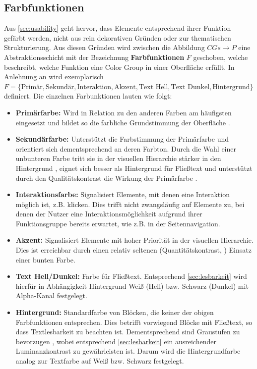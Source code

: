 \documentclass[11pt, bibliography=totoc]{scrartcl}
\begin{document}
\subsection{Farbfunktionen}
Aus \autoref{sec:usability} geht hervor, dass Elemente entsprechend ihrer Funktion gefärbt werden, nicht aus rein dekorativen Gründen oder zur thematischen Strukturierung. Aus diesen Gründen wird zwischen die Abbildung $CGs \to P$ eine Abstraktionsschicht mit der Bezeichnung \textbf{Farbfunktionen} $F$ geschoben, welche beschreibt, welche Funktion eine Color Group in einer Oberfläche erfüllt. In Anlehnung an \citep{google,  smashing} wird exemplarisch $F = \{\text{Primär}, \text{Sekundär}, \text{Interaktion}, \text{Akzent}, \text{Text Hell}, \text{Text Dunkel}, \text{Hintergrund}\}$ definiert. Die einzelnen Farbunktionen lauten wie folgt:
\begin{itemize}
	\item \textbf{Primärfarbe:} Wird in Relation zu den anderen Farben am häufigsten eingesetzt und bildet so die farbliche Grundstimmung der Oberfläche \citep{awwwards}.
	\item \textbf{Sekundärfarbe:} Unterstützt die Farbstimmung der Primärfarbe und orientiert sich dementsprechend an deren Farbton. Durch die Wahl einer unbunteren Farbe tritt sie in der visuellen Hierarchie stärker in den Hintergrund \citep{visual-hierarchy}, eignet sich besser als Hintergrund für Fließtext und unterstützt durch den Qualitätskontrast die Wirkung der Primärfarbe \citep{webdesign}.
	\item \textbf{Interaktionsfarbe:} Signalisiert Elemente, mit denen eine Interaktion möglich ist, z.B. klicken. Dies trifft nicht zwangsläufig auf Elemente zu, bei denen der Nutzer eine Interaktionsmöglichkeit aufgrund ihrer Funktionsgruppe bereits erwartet, wie z.B. in der Seitennavigation.
	\item \textbf{Akzent:} Signalisiert Elemente mit hoher Priorität in der visuellen Hierarchie. Dies ist erreichbar durch einen relativ seltenen (Quantitätskontrast, \citep{webdesign}) Einsatz einer bunten \citep{visual-hierarchy} Farbe.
	\item \textbf{Text Hell/Dunkel:} Farbe für Fließtext. Entsprechend \autoref{sec:lesbarkeit} wird hierfür in Abhängigkeit Hintergrund Weiß (Hell) bzw. Schwarz (Dunkel) mit Alpha-Kanal festgelegt.
	\item \textbf{Hintergrund:} Standardfarbe von Blöcken, die keiner der obigen Farbfunktionen entsprechen. Dies betrifft vorwiegend Blöcke mit Fließtext, so dass Textlesbarkeit zu beachten ist. Dementsprechend sind Graustufen zu bevorzugen \citep{webx0}, wobei entsprechend \autoref{sec:lesbarkeit} ein ausreichender Luminanzkontrast zu gewährleisten ist. Darum wird die Hintergrundfarbe analog zur Textfarbe auf Weiß bzw. Schwarz festgelegt.
\end{itemize}
\end{document}
